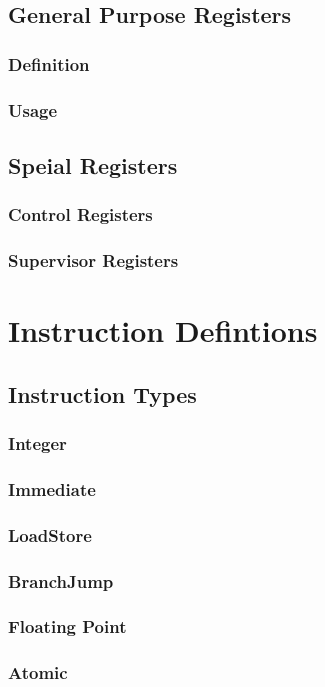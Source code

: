 \documentclass[letterpaper]{article}
\begin{document}
\subsection{General Purpose Registers}
\subsubsection{Definition}
\subsubsection{Usage}
\subsection{Speial Registers}
\subsubsection{Control Registers}
\subsubsection{Supervisor Registers}


\section{Instruction Defintions}
\subsection{Instruction Types}
\subsubsection{Integer}
\subsubsection{Immediate}
\subsubsection{Load\/Store}
\subsubsection{Branch\/Jump}
\subsubsection{Floating Point}
\subsubsection{Atomic}
\end{document}
